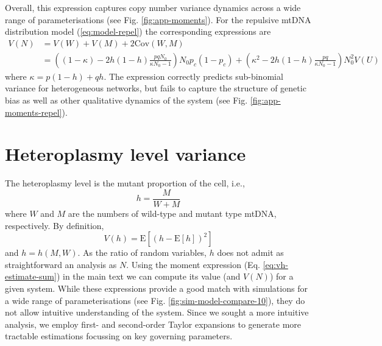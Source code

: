 \documentclass{article}
\begin{document}
\begin{appendices}
Overall, this expression captures copy number variance dynamics across a wide range of parameterisations (see Fig. \ref{fig:app-moments}). For the repulsive mtDNA distribution model (\ref{eq:model-repel}) the corresponding expressions are
\begin{equation}\label{eq:app-vn-net-repel}
    \begin{split}
    V(N)&=V(W)+V(M)+2\mathrm{Cov}(W,M)\\
         &=\left((1-\kappa)-2h(1-h)\frac{pqN_0}{\kappa N_0-1}\right)N_0p_c(1-p_c)
         +\left(\kappa^2-2h(1-h)\frac{pq}{\kappa N_0-1}\right)N_0^2V(U)
    \end{split}
\end{equation}
where $\kappa = p(1-h)+qh$. The expression correctly predicts sub-binomial variance for heterogeneous networks, but fails to capture the structure of genetic bias as well as other qualitative dynamics of the system (see Fig. \ref{fig:app-moments-repel}).

\section{Heteroplasmy level variance}\label{app:vh-est}
The heteroplasmy level is the mutant proportion of the cell, i.e.,
\begin{equation}
    h=\frac{M}{W+M}
\end{equation}
where $W$ and $M$ are the numbers of wild-type and mutant type mtDNA, respectively. By definition,
\begin{equation}\label{eq:app-vhest}
    V(h)=\mathrm{E}\left[(h-\mathrm{E}[h])^2\right]
\end{equation}
and $h=h(M,W)$. As the ratio of random variables, $h$ does not admit as straightforward an analysis as $N$. Using the moment expression (Eq. \ref{eq:vh-estimate-sum}) in the main text we can compute its value (and $V(N)$) for a given system. While these expressions provide a good match with simulations for a wide range of parameterisations (see Fig. \ref{fig:sim-model-compare-10}), they do not allow intuitive understanding of the system. Since we sought a more intuitive analysis, we employ first- and second-order Taylor expansions to generate more tractable estimations focussing on key governing parameters.


\end{appendices}
\end{document}
